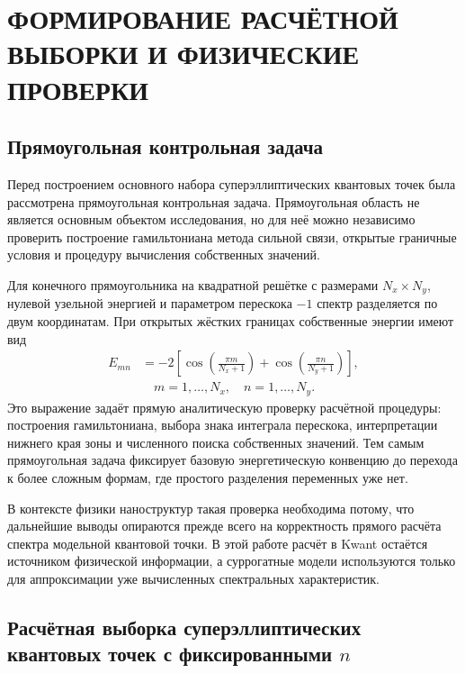 \chapter{ФОРМИРОВАНИЕ РАСЧЁТНОЙ ВЫБОРКИ И ФИЗИЧЕСКИЕ ПРОВЕРКИ}

\section{Прямоугольная контрольная задача}

Перед построением основного набора суперэллиптических квантовых точек была рассмотрена
прямоугольная контрольная задача. Прямоугольная область не является основным объектом
исследования, но для неё можно независимо проверить построение гамильтониана метода
сильной связи, открытые граничные условия и процедуру вычисления собственных значений.

Для конечного прямоугольника на квадратной решётке с размерами $N_x \times N_y$, нулевой
узельной энергией и параметром перескока $-1$ спектр разделяется по двум координатам. При
открытых жёстких границах собственные энергии имеют вид
\begin{equation}
\begin{aligned}
  E_{mn}
  &=
  -2\left[
    \cos\left(\frac{\pi m}{N_x + 1}\right)
    +
    \cos\left(\frac{\pi n}{N_y + 1}\right)
  \right], \\
  &\quad
  m=1,\ldots,N_x,\quad n=1,\ldots,N_y .
\end{aligned}
\end{equation}
Это выражение задаёт прямую аналитическую проверку расчётной процедуры: построения
гамильтониана, выбора знака интеграла перескока, интерпретации нижнего края зоны и
численного поиска собственных значений. Тем самым прямоугольная задача фиксирует базовую
энергетическую конвенцию до перехода к более сложным формам, где простого разделения
переменных уже нет.

В контексте физики наноструктур такая проверка необходима потому, что дальнейшие выводы
опираются прежде всего на корректность прямого расчёта спектра модельной квантовой точки.
В этой работе расчёт в Kwant остаётся источником физической информации, а суррогатные
модели используются только для аппроксимации уже вычисленных спектральных характеристик.

\section{Расчётная выборка суперэллиптических квантовых точек с фиксированными $n$}

